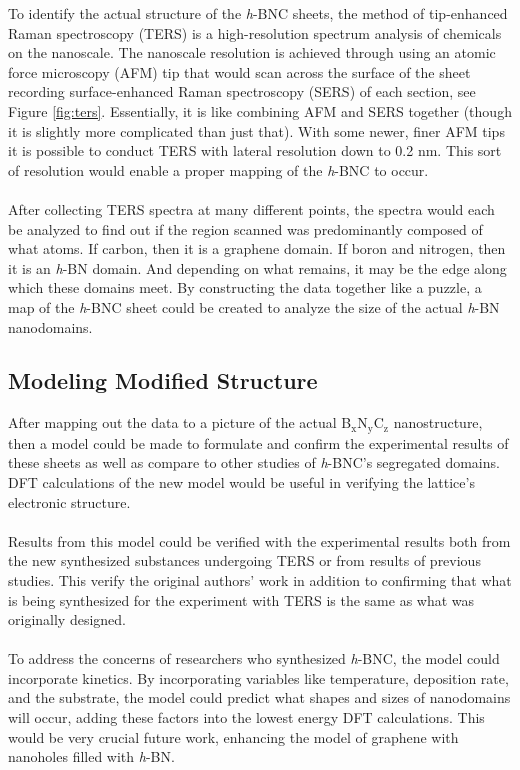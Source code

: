 \documentclass[11pt]{article}
\newcommand{\sub}[1]{\ensuremath{_{\textrm{#1}}}}
\begin{document}
\begin{multicols}{2}
To identify the actual structure of the \textit{h}-BNC sheets, the method of tip-enhanced Raman spectroscopy (TERS) is a high-resolution spectrum analysis of chemicals on the nanoscale.\cite{ters} The nanoscale resolution is achieved through using an atomic force microscopy (AFM) tip that would scan across the surface of the sheet recording surface-enhanced Raman spectroscopy (SERS) of each section, see Figure \ref{fig:ters}. Essentially, it is like combining AFM and SERS together (though it is slightly more complicated than just that). With some newer, finer AFM tips it is possible to conduct TERS with lateral resolution down to 0.2 nm.\cite{ters} This sort of resolution would enable a proper mapping of the \textit{h}-BNC to occur. \\ \\

After collecting TERS spectra at many different points, the spectra would each be analyzed to find out if the region scanned was predominantly composed of what atoms. If carbon, then it is a graphene domain. If boron and nitrogen, then it is an \textit{h}-BN domain. And depending on what remains, it may be the edge along which these domains meet. By constructing the data together like a puzzle, a map of the \textit{h}-BNC sheet could be created to analyze the size of the actual \textit{h}-BN nanodomains.

\subsection{Modeling Modified Structure}
After mapping out the data to a picture of the actual B\sub{x}N\sub{y}C\sub{z} nanostructure, then a model could be made to formulate and confirm the experimental results of these sheets\cite{synth} as well as compare to other studies of \textit{h}-BNC's segregated domains.\cite{main} DFT calculations of the new model would be useful in verifying the lattice's electronic structure. \\ \\

Results from this model could be verified with the experimental results both from the new synthesized substances undergoing TERS or from results of previous studies. This verify the original authors' work in addition to confirming that what is being synthesized for the experiment with TERS is the same as what was originally designed. \\ \\

To address the concerns of researchers who synthesized \textit{h}-BNC, the model could incorporate kinetics. By incorporating variables like temperature, deposition rate, and the substrate, the model could predict what shapes and sizes of nanodomains will occur, adding these factors into the lowest energy DFT calculations. This would be very crucial future work, enhancing the model of graphene with nanoholes filled with \textit{h}-BN.




\end{multicols}
\end{document}
